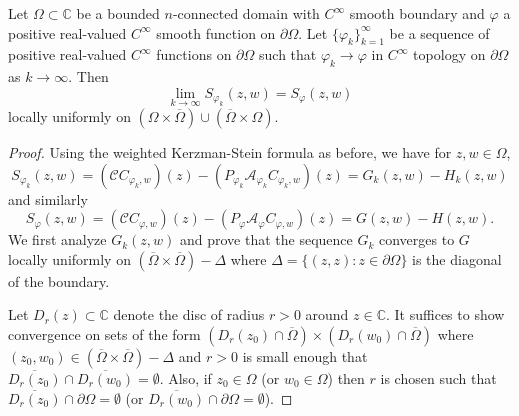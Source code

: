 \documentclass[10pt,a4paper]{amsart}
\newcommand{\mbb}{\mathbb}
\begin{document}
\begin{thm}\label{ram 2}
Let $\Omega\subset\mathbb{C}$ be a bounded $n$-connected domain with $C^{\infty}$ smooth boundary and $\varphi$ a positive real-valued $C^{\infty}$ smooth function on $\partial\Omega$. 
Let $\{\varphi_k\}_{k=1}^{\infty}$ be a sequence of positive real-valued $C^{\infty}$ functions on $\partial\Omega$ such that $\varphi_k\rightarrow\varphi$ in $C^{\infty}$ topology on $\partial\Omega$ as $k\rightarrow\infty$. Then 
\[
\lim_{k\rightarrow\infty}S_{\varphi_k}(z,w) = S_{\varphi}(z,w)
\]
locally uniformly on $(\Omega\times\overline{\Omega})\cup(\overline{\Omega}\times\Omega)$.
\end{thm}

\begin{proof}
Using the weighted Kerzman-Stein formula as before, we have for $z,w\in\Omega$,
\[
S_{\varphi_k}(z,w)
=
(\mathcal{C} C_{\varphi_k,w})(z) - (P_{\varphi_k} \mathcal{A}_{\varphi_k} C_{\varphi_k,w})(z)
=
G_{k}(z,w)-H_k(z,w)
\]
and similarly
\[
S_{\varphi}(z,w)
=
(\mathcal{C} C_{\varphi,w})(z) - (P_{\varphi} \mathcal{A}_{\varphi} C_{\varphi,w})(z)
=
G(z,w)-H(z,w).
\]
We first analyze $G_k(z,w)$ and prove that the sequence $G_k$ converges to $G$ locally uniformly on $(\overline{\Omega}\times\overline{\Omega})-\Delta$ where $\Delta=\{(z,z) : z\in\partial\Omega\}$ is the diagonal of the boundary.

\medskip

Let $D_r(z) \subset \mbb C$ denote the disc of radius $r > 0$ around $z \in \mbb C$. It suffices to show convergence on sets of the form $(D_r(z_0)\cap \overline{\Omega})\times (D_r(w_0)\cap\overline{\Omega})$ where $(z_0,w_0)\in(\overline{\Omega}\times\overline{\Omega})-\Delta$ and $r>0$ is small enough that $\overline{D_r(z_0)}\cap \overline{D_r(w_0)}=\emptyset$. Also, if $z_0\in\Omega$ (or $w_0\in\Omega$) then $r$ is chosen such that $\overline{D_r(z_0)}\cap \partial\Omega=\emptyset$ (or $\overline{D_r(w_0)}\cap \partial\Omega=\emptyset$).

\medskip


\end{proof}
\end{document}
